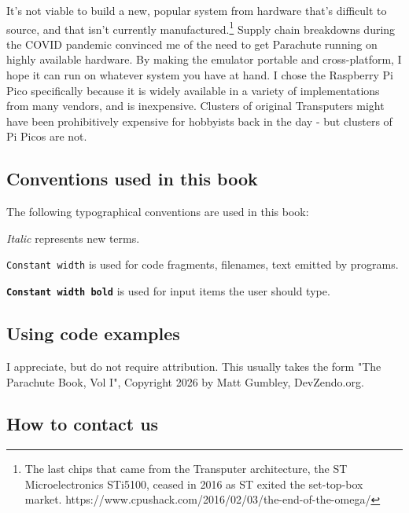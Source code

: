\documentclass[a4paper]{tufte-book}
\begin{document}
\vspace{5mm}

It's not viable to build a new, popular system from hardware that's difficult to source, and that isn't currently manufactured.\footnote{ The last chips that came from the Transputer architecture, the ST Microelectronics STi5100, ceased in 2016 as ST exited the set-top-box market. https://www.cpushack.com/2016/02/03/the-end-of-the-omega/ } Supply chain breakdowns during the COVID pandemic convinced me of the need to get Parachute running on highly available hardware. By making the emulator portable and cross-platform, I hope it can run on whatever system you have at hand. I chose the Raspberry Pi Pico specifically because it is widely available in a variety of implementations from many vendors, and is inexpensive. Clusters of original Transputers might have been prohibitively expensive for hobbyists back in the day - but clusters of Pi Picos are not.


    

\subsection{Conventions used in this book}

The following typographical conventions are used in this book:

\textit{Italic} represents new terms.

\verb|Constant width| is used for code fragments, filenames, text emitted by programs.

\texttt{\textbf{Constant width bold}} is used for input items the user should type.
 

\subsection{Using code examples}

I appreciate, but do not require attribution. This usually takes the form "The Parachute Book, Vol I", Copyright 2026 by Matt Gumbley, DevZendo.org.


\subsection{How to contact us}
\end{document}
